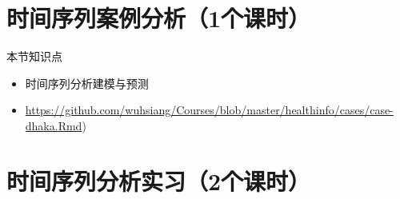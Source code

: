 \documentclass[
  ignorenonframetext,
]{beamer}
\begin{document}
\hypertarget{ux65f6ux95f4ux5e8fux5217ux6848ux4f8bux5206ux67901ux4e2aux8bfeux65f6}{%
\section{时间序列案例分析（1个课时）}\label{ux65f6ux95f4ux5e8fux5217ux6848ux4f8bux5206ux67901ux4e2aux8bfeux65f6}}

\begin{frame}{本节知识点}
\protect\hypertarget{ux672cux8282ux77e5ux8bc6ux70b9-2}{}

\begin{itemize}
\item
  时间序列分析建模与预测
\item
  \url{https://github.com/wuhsiang/Courses/blob/master/healthinfo/cases/case-dhaka.Rmd})
\end{itemize}

\end{frame}

\hypertarget{ux65f6ux95f4ux5e8fux5217ux5206ux6790ux5b9eux4e602ux4e2aux8bfeux65f6}{%
\section{时间序列分析实习（2个课时）}\label{ux65f6ux95f4ux5e8fux5217ux5206ux6790ux5b9eux4e602ux4e2aux8bfeux65f6}}
\end{document}
